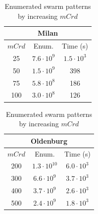 \documentclass[preprint,12pt,authoryear]{elsarticle} %
\renewcommand{\sf}[1]{\textsf{\textup{#1}}}
\begin{document}
\begin{table}[t]
\scriptsize\centering
\caption{Enumerated swarm patterns by increasing $mCrd$}
\label{tab:effcard}%

\begin{tabular}{ccc}
\multicolumn{3}{c}{\sf{Milan}}\\
\toprule
$mCrd$ &         Enum. &          Time (s)     \\
\midrule
    25 &  $7.6\cdot10^{9}$ &  $1.5\cdot10^{3}$ \\
    50 &  $1.5\cdot10^{9}$ &               398 \\
    75 &  $5.8\cdot10^{8}$ &               186 \\
   100 &  $3.0\cdot10^{8}$ &               126 \\
\bottomrule
\end{tabular}
\begin{tabular}{ccc}
\multicolumn{3}{c}{\sf{Oldenburg}}\\
\toprule
$mCrd$ &         Enum. &          Time (s) \\
\midrule
200 &  $1.3\cdot10^{10}$ &  $6.0\cdot10^{3}$ \\
300 &   $6.6\cdot10^{9}$ &  $3.7\cdot10^{3}$ \\
400 &   $3.7\cdot10^{9}$ &  $2.6\cdot10^{3}$ \\
500 &   $2.4\cdot10^{9}$ &  $1.8\cdot10^{3}$ \\
\bottomrule
\end{tabular}
% 
\end{table}%
\end{document}
